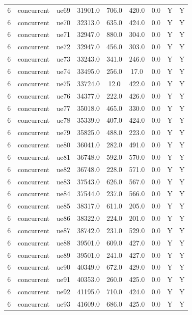 \begin{table}[ht]
\begin{tabular}{|c|c|c|c|c|c|c|c|c|}
6 & concurrent & ue69 & 31901.0 & 706.0 & 420.0 & 0.0 & Y & Y \\
6 & concurrent & ue70 & 32313.0 & 635.0 & 424.0 & 0.0 & Y & Y \\
6 & concurrent & ue71 & 32947.0 & 880.0 & 304.0 & 0.0 & Y & Y \\
6 & concurrent & ue72 & 32947.0 & 456.0 & 303.0 & 0.0 & Y & Y \\
6 & concurrent & ue73 & 33243.0 & 341.0 & 246.0 & 0.0 & Y & Y \\
6 & concurrent & ue74 & 33495.0 & 256.0 & 17.0 & 0.0 & Y & Y \\
6 & concurrent & ue75 & 33724.0 & 12.0 & 422.0 & 0.0 & Y & Y \\
6 & concurrent & ue76 & 34377.0 & 222.0 & 426.0 & 0.0 & Y & Y \\
6 & concurrent & ue77 & 35018.0 & 465.0 & 330.0 & 0.0 & Y & Y \\
6 & concurrent & ue78 & 35339.0 & 407.0 & 424.0 & 0.0 & Y & Y \\
6 & concurrent & ue79 & 35825.0 & 488.0 & 223.0 & 0.0 & Y & Y \\
6 & concurrent & ue80 & 36041.0 & 282.0 & 491.0 & 0.0 & Y & Y \\
6 & concurrent & ue81 & 36748.0 & 592.0 & 570.0 & 0.0 & Y & Y \\
6 & concurrent & ue82 & 36748.0 & 228.0 & 571.0 & 0.0 & Y & Y \\
6 & concurrent & ue83 & 37543.0 & 626.0 & 567.0 & 0.0 & Y & Y \\
6 & concurrent & ue84 & 37544.0 & 237.0 & 566.0 & 0.0 & Y & Y \\
6 & concurrent & ue85 & 38317.0 & 611.0 & 205.0 & 0.0 & Y & Y \\
6 & concurrent & ue86 & 38322.0 & 224.0 & 201.0 & 0.0 & Y & Y \\
6 & concurrent & ue87 & 38742.0 & 231.0 & 529.0 & 0.0 & Y & Y \\
6 & concurrent & ue88 & 39501.0 & 609.0 & 427.0 & 0.0 & Y & Y \\
6 & concurrent & ue89 & 39501.0 & 241.0 & 427.0 & 0.0 & Y & Y \\
6 & concurrent & ue90 & 40349.0 & 672.0 & 429.0 & 0.0 & Y & Y \\
6 & concurrent & ue91 & 40353.0 & 260.0 & 425.0 & 0.0 & Y & Y \\
6 & concurrent & ue92 & 41195.0 & 710.0 & 424.0 & 0.0 & Y & Y \\
6 & concurrent & ue93 & 41609.0 & 686.0 & 425.0 & 0.0 & Y & Y \\

\end{tabular}
\end{table}
